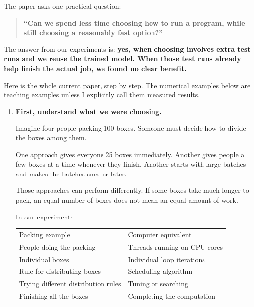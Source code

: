 \documentclass[11pt,a4paper]{article}
\providecommand{\href}[2]{#2}
\newcommand{\toprule}{\hline\noalign{\vskip3pt}}
\newcommand{\midrule}{\noalign{\vskip2pt}\hline\noalign{\vskip3pt}}
\newcommand{\bottomrule}{\noalign{\vskip3pt}\hline}
\begin{document}
The paper asks one practical question:

\begin{quote}
\textbf{``Can we spend less time choosing how to run a program, while still choosing a reasonably fast option?''}
\end{quote}

The answer from our experiments is: \textbf{yes, when choosing involves extra test runs and we reuse the trained model. When those test runs already help finish the actual job, we found no clear benefit.}

Here is the whole \href{/home/shaan/pcap/deliverables/current/PCAP_TRADEOFF_PAPER_G3.pdf}{current paper}, step by step. The numerical examples below are teaching examples unless I explicitly call them measured results.

\begin{enumerate}
\def\labelenumi{\arabic{enumi}.}
\item
  \textbf{First, understand what we were choosing.}

  Imagine four people packing 100 boxes. Someone must decide how to divide the boxes among them.

  One approach gives everyone 25 boxes immediately. Another gives people a few boxes at a time whenever they finish. Another starts with large batches and makes the batches smaller later.

  Those approaches can perform differently. If some boxes take much longer to pack, an equal number of boxes does not mean an equal amount of work.

  In our experiment:

  {\def\LTcaptype{none} %
  \begin{longtable}[]{@{}
    >{\raggedright\arraybackslash}p{}
    >{\raggedright\arraybackslash}p{}@{}}
  \toprule\noalign{}
  Packing example & Computer equivalent \\
  \midrule\noalign{}
  \endhead
  \bottomrule\noalign{}
  \endlastfoot
  People doing the packing & Threads running on CPU cores \\
  Individual boxes & Individual loop iterations \\
  Rule for distributing boxes & Scheduling algorithm \\
  Trying different distribution rules & Tuning or searching \\
  Finishing all the boxes & Completing the computation \\
  \end{longtable}
  }


\end{enumerate}
\end{document}
